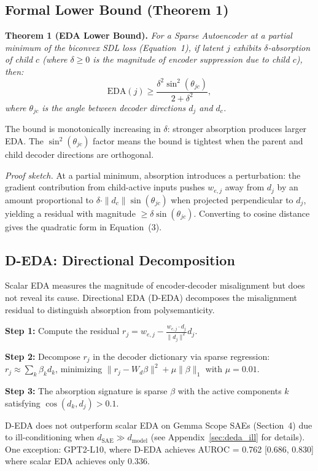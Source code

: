 \documentclass{article}
\begin{document}
\subsection{Formal Lower Bound (Theorem 1)}

\textbf{Theorem 1 (EDA Lower Bound).} \textit{For a Sparse Autoencoder at a partial minimum of the biconvex SDL loss (Equation~1), if latent $j$ exhibits $\delta$-absorption of child $c$ (where $\delta \geq 0$ is the magnitude of encoder suppression due to child $c$), then:}
\begin{equation}
\text{EDA}(j) \geq \frac{\delta^2 \sin^2(\theta_{jc})}{2 + \delta^2},
\tag{3}
\end{equation}
\textit{where $\theta_{jc}$ is the angle between decoder directions $d_j$ and $d_c$.}

The bound is monotonically increasing in $\delta$: stronger absorption produces larger EDA. The $\sin^2(\theta_{jc})$ factor means the bound is tightest when the parent and child decoder directions are orthogonal.

\textit{Proof sketch.} At a partial minimum, absorption introduces a perturbation: the gradient contribution from child-active inputs pushes $w_{e,j}$ away from $d_j$ by an amount proportional to $\delta \cdot \|d_c\| \sin(\theta_{jc})$ when projected perpendicular to $d_j$, yielding a residual with magnitude $\geq \delta \sin(\theta_{jc})$. Converting to cosine distance gives the quadratic form in Equation~(3).

\subsection{D-EDA: Directional Decomposition}

Scalar EDA measures the magnitude of encoder-decoder misalignment but does not reveal its cause. Directional EDA (D-EDA) decomposes the misalignment residual to distinguish absorption from polysemanticity.

\textbf{Step 1:} Compute the residual $r_j = w_{e,j} - \frac{w_{e,j} \cdot d_j}{\|d_j\|^2} d_j$.

\textbf{Step 2:} Decompose $r_j$ in the decoder dictionary via sparse regression: $r_j \approx \sum_k \beta_k d_k$, minimizing $\|r_j - W_d \beta\|^2 + \mu \|\beta\|_1$ with $\mu = 0.01$.

\textbf{Step 3:} The absorption signature is sparse $\beta$ with the active components $k$ satisfying $\cos(d_k, d_j) > 0.1$.

D-EDA does not outperform scalar EDA on Gemma Scope SAEs (Section~4) due to ill-conditioning when $d_{\text{SAE}} \gg d_{\text{model}}$ (see Appendix~\ref{sec:deda_ill} for details). One exception: GPT2-L10, where D-EDA achieves AUROC = 0.762 [0.686, 0.830] where scalar EDA achieves only 0.336.
\end{document}
